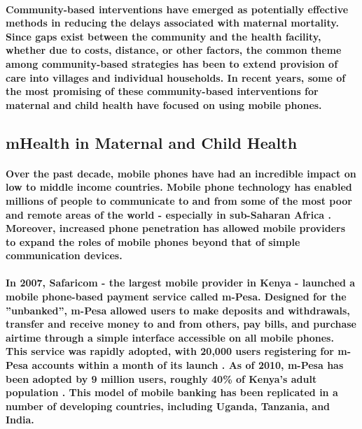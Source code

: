 \paragraph{Community-based interventions have emerged as potentially effective methods in reducing the delays associated with maternal mortality. Since gaps exist between the community and the health facility, whether due to costs, distance, or other factors, the common theme among community-based strategies has been to extend provision of care into villages and individual households. In recent years, some of the most promising of these community-based interventions for maternal and child health have focused on using mobile phones.}

\subsection{mHealth in Maternal and Child Health}
\paragraph{Over the past decade, mobile phones have had an incredible impact on low to middle income countries. Mobile phone technology has enabled millions of people to communicate to and from some of the most poor and remote areas of the world - especially in sub-Saharan Africa \citep{Adler2007}. Moreover, increased phone penetration has allowed mobile providers to expand the roles of mobile phones  beyond that of simple communication devices.}

\paragraph{In 2007, Safaricom - the largest mobile provider in Kenya - launched a mobile phone-based payment service called m-Pesa. Designed for the ''unbanked'', m-Pesa allowed users to make deposits and withdrawals, transfer and receive money to and from others, pay bills, and purchase airtime through a simple interface accessible on all mobile phones. This service was rapidly adopted, with 20,000 users registering for m-Pesa accounts within a month of its launch \citep{Hughes2007}. As of 2010, m-Pesa has been adopted by 9 million users, roughly 40\% of Kenya's adult population \citep{Mas2010}. This model of mobile banking has been replicated in a number of developing countries, including Uganda, Tanzania, and India.}

